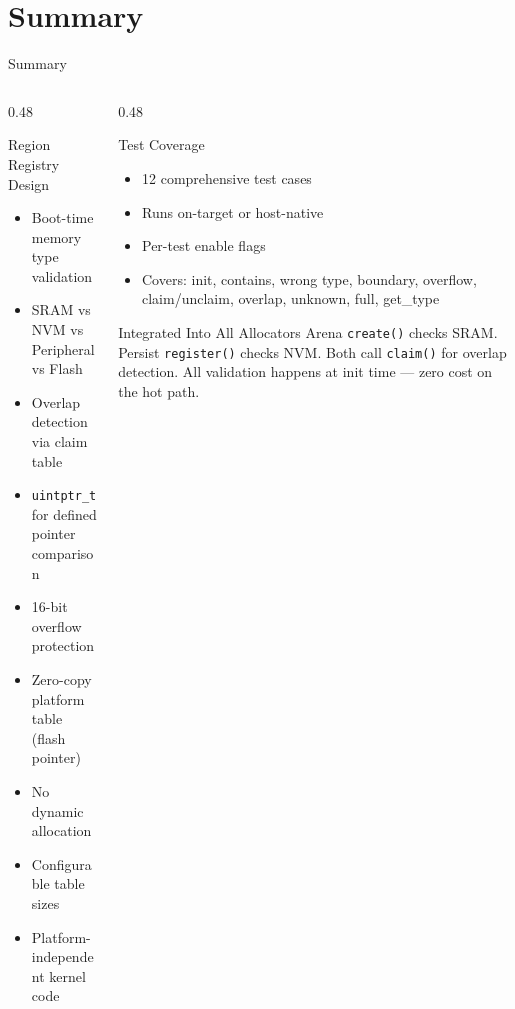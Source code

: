 \documentclass[aspectratio=169, 10pt]{beamer}
\begin{document}
\section{Summary}

\begin{frame}{Summary}
\begin{columns}[T]
\begin{column}{0.48\textwidth}
\begin{block}{Region Registry Design}
\begin{itemize}
  \item Boot-time memory type validation
  \item SRAM vs NVM vs Peripheral vs Flash
  \item Overlap detection via claim table
  \item \texttt{uintptr\_t} for defined pointer comparison
  \item 16-bit overflow protection
  \item Zero-copy platform table (flash pointer)
  \item No dynamic allocation
  \item Configurable table sizes
  \item Platform-independent kernel code
\end{itemize}
\end{block}
\end{column}

\begin{column}{0.48\textwidth}
\begin{block}{Test Coverage}
\begin{itemize}
  \item 12 comprehensive test cases
  \item Runs on-target or host-native
  \item Per-test enable flags
  \item Covers: init, contains, wrong type,
        boundary, overflow, claim/unclaim,
        overlap, unknown, full, get\_type
\end{itemize}
\end{block}

\vspace{0.3em}
\begin{alertblock}{Integrated Into All Allocators}
Arena \texttt{create()} checks SRAM.
Persist \texttt{register()} checks NVM.
Both call \texttt{claim()} for overlap detection.
All validation happens at init time ---
zero cost on the hot path.
\end{alertblock}
\end{column}
\end{columns}
\end{frame}
\end{document}
